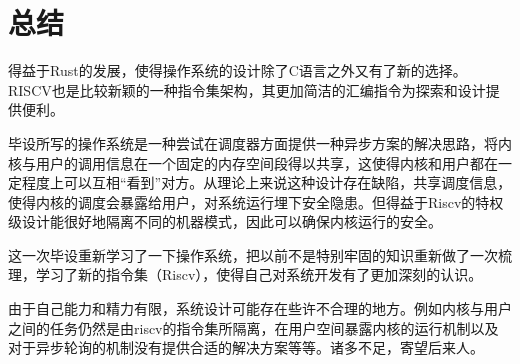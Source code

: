 \chapter{总结}
\label{chap:Summary}

得益于Rust的发展，使得操作系统的设计除了C语言之外又有了新的选择。 RISCV也是比较新颖的一种指令集架构，其更加简洁的汇编指令为探索和设计提供便利。

毕设所写的操作系统是一种尝试在调度器方面提供一种异步方案的解决思路，将内核与用户的调用信息在一个固定的内存空间段得以共享，这使得内核和用户都在一定程度上可以互相“看到”对方。从理论上来说这种设计存在缺陷，共享调度信息，使得内核的调度会暴露给用户，对系统运行埋下安全隐患。但得益于Riscv的特权级设计能很好地隔离不同的机器模式，因此可以确保内核运行的安全。

这一次毕设重新学习了一下操作系统，把以前不是特别牢固的知识重新做了一次梳理，学习了新的指令集（Riscv），使得自己对系统开发有了更加深刻的认识。

由于自己能力和精力有限，系统设计可能存在些许不合理的地方。例如内核与用户之间的任务仍然是由riscv的指令集所隔离，在用户空间暴露内核的运行机制以及对于异步轮询的机制没有提供合适的解决方案等等。诸多不足，寄望后来人。
